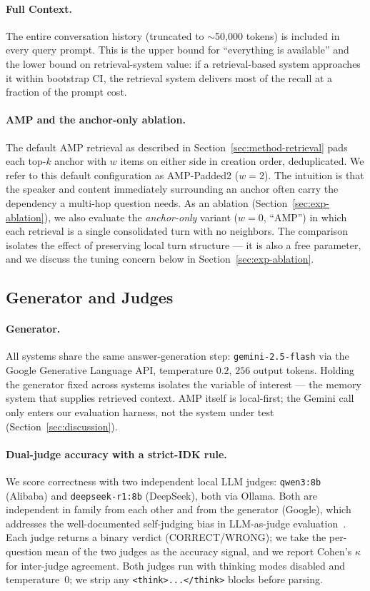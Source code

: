 \paragraph{Full Context.} The entire conversation history (truncated to $\sim$50{,}000 tokens) is included in every query prompt. This is the upper bound for ``everything is available'' and the lower bound on retrieval-system value: if a retrieval-based system approaches it within bootstrap CI, the retrieval system delivers most of the recall at a fraction of the prompt cost.

\paragraph{AMP and the anchor-only ablation.} The default AMP retrieval as described in Section~\ref{sec:method-retrieval} pads each top-$k$ anchor with $w$ items on either side in creation order, deduplicated. We refer to this default configuration as AMP-Padded2 ($w = 2$). The intuition is that the speaker and content immediately surrounding an anchor often carry the dependency a multi-hop question needs. As an ablation (Section~\ref{sec:exp-ablation}), we also evaluate the \emph{anchor-only} variant ($w = 0$, ``AMP'') in which each retrieval is a single consolidated turn with no neighbors. The comparison isolates the effect of preserving local turn structure --- it is also a free parameter, and we discuss the tuning concern below in Section~\ref{sec:exp-ablation}.

\subsection{Generator and Judges}
\label{sec:exp-models}

\paragraph{Generator.} All systems share the same answer-generation step: \texttt{gemini-2.5-flash} via the Google Generative Language API, temperature $0.2$, $256$ output tokens. Holding the generator fixed across systems isolates the variable of interest --- the memory system that supplies retrieved context. AMP itself is local-first; the Gemini call only enters our evaluation harness, not the system under test (Section~\ref{sec:discussion}).

\paragraph{Dual-judge accuracy with a strict-IDK rule.} We score correctness with two independent local LLM judges: \texttt{qwen3:8b} (Alibaba) and \texttt{deepseek-r1:8b} (DeepSeek), both via Ollama. Both are independent in family from each other and from the generator (Google), which addresses the well-documented self-judging bias in LLM-as-judge evaluation~\citep{zheng2023judging}. Each judge returns a binary verdict (CORRECT/WRONG); we take the per-question mean of the two judges as the accuracy signal, and we report Cohen's $\kappa$~\citep{landis1977kappa} for inter-judge agreement. Both judges run with thinking modes disabled and temperature~$0$; we strip any \texttt{<think>...</think>} blocks before parsing.

